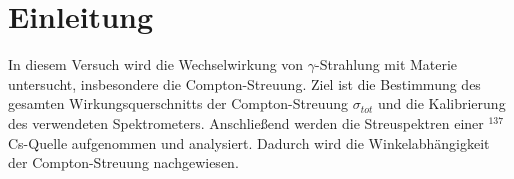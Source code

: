 \section{Einleitung}
In diesem Versuch wird die Wechselwirkung von $\gamma$-Strahlung mit Materie untersucht, insbesondere die Compton-Streuung. Ziel ist die Bestimmung des gesamten Wirkungsquerschnitts der Compton-Streuung $\sigma_{tot}$ und die Kalibrierung des verwendeten Spektrometers. Anschließend werden die Streuspektren einer $^{137}$Cs-Quelle aufgenommen und analysiert. Dadurch wird die Winkelabhängigkeit der Compton-Streuung nachgewiesen.